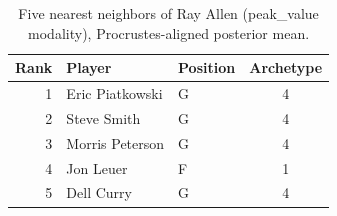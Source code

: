 \begin{table}[htbp]
  \centering\small
  \begin{tabular}{rllc}
    \toprule
    Rank & Player & Position & Archetype \\
    \midrule
    1 & Eric Piatkowski & G & 4 \\
    2 & Steve Smith & G & 4 \\
    3 & Morris Peterson & G & 4 \\
    4 & Jon Leuer & F & 1 \\
    5 & Dell Curry & G & 4 \\
    \bottomrule
  \end{tabular}
  \caption{Five nearest neighbors of Ray Allen (peak_value modality), Procrustes-aligned posterior mean.}
  \label{tab:Ray_Allen_neighbors_peak_value}
\end{table}

